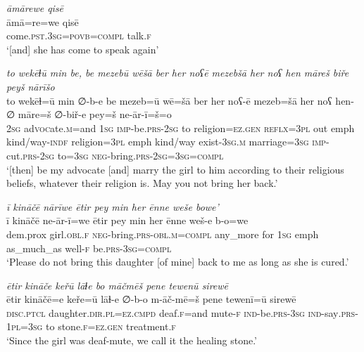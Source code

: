 \ea \label{ZP.46}
\textit{āmārewe qisē} \\ 
\gll āmā=re=we qisē \\ 
 come\textsc{.pst}\textsc{.3sg}\textsc{=\textsc{povb}}\textsc{=\textsc{compl}} talk\textsc{.f} \\ 
\glt `[and] she has come to speak again'
\z 
 
\ea \label{ZP.47}
\textit{to wekēɫū min be, be mezebū wēšā ber her noʕē mezebšā her noʕ hen māreš biře peyš nārīšo} \\ 
\gll to wekēɫ=ū min ∅-b-e be mezeb=ū wē=šā ber her noʕ-ē mezeb=šā her noʕ hen-∅ māre=š ∅-biř-e pey=š ne-ār-ī=š=o \\ 
 \textsc{2sg} ad\textsc{voc}ate\textsc{.m}=and \textsc{1sg} \textsc{imp-}be\textsc{.prs}-\textsc{2sg} to religion\textsc{\textsc{=ez.gen}} \textsc{reflx}\textsc{=3pl} out emph kind/way\textsc{-indf} religion\textsc{=3pl} emph kind/way exist\textsc{-3sg}\textsc{.m} marriage\textsc{=3sg} \textsc{imp-}cut\textsc{.prs}-\textsc{2sg} to\textsc{=3sg} \textsc{neg-}bring\textsc{.prs}\textsc{-2sg}\textsc{=3sg}\textsc{=compl} \\ 
\glt `[then] be my advocate [and] marry the girl to him according to their religious beliefs, whatever their religion is. May you not bring her back.'
\z 
 
\ea \label{ZP.48}
\textit{ī kināčē nārīwe ētir pey min her ēnne weše bowe’} \\ 
\gll ī kināčē ne-ār-ī=we ētir pey min her ēnne weš-e b-o=we \\ 
 dem.prox girl\textsc{.obl}\textsc{.f} \textsc{neg-}bring\textsc{.prs}\textsc{-obl}\textsc{.m}\textsc{=compl} any\_more for \textsc{1sg} emph as\_much\_as well\textsc{-f} be\textsc{.prs}\textsc{-3sg}\textsc{=compl} \\ 
\glt `Please do not bring this daughter [of mine] back to me as long as she is cured.'
\z 
 
\ea \label{ZP.51}
\textit{ētir kināče keřū lāɫe bo māčmēš pene tewenū sirewē} \\ 
\gll ētir kināčē=e keře=ū lāɫ-e ∅-b-o m-āč-mē=š pene tewenī=ū sirewē \\ 
 \textsc{disc.ptcl} daughter\textsc{.dir}\textsc{.pl}\textsc{=ez}\textsc{.cmpd} deaf\textsc{.f}=and mute\textsc{-f} \textsc{ind-}be\textsc{.prs}\textsc{-3sg} \textsc{ind-}say\textsc{.prs}\textsc{-1pl}\textsc{=3sg} to stone\textsc{.f}\textsc{\textsc{=ez.gen}} treatment\textsc{.f} \\ 
\glt `Since the girl was deaf-mute, we call it the healing stone.'
\z 
 
